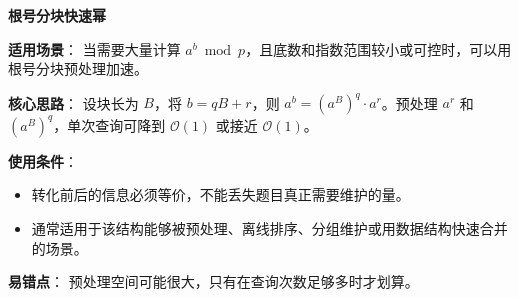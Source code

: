 \par\medskip\noindent\textbf{根号分块快速幂}\par\smallskip
\textbf{适用场景}：
当需要大量计算 $a^b\bmod p$，且底数和指数范围较小或可控时，可以用根号分块预处理加速。

\textbf{核心思路}：
设块长为 $B$，将 $b=qB+r$，则 $a^b=(a^B)^q\cdot a^r$。预处理 $a^r$ 和 $(a^B)^q$，单次查询可降到 $\mathcal{O}(1)$ 或接近 $\mathcal{O}(1)$。

\textbf{使用条件}：
\begin{itemize}
  \item 转化前后的信息必须等价，不能丢失题目真正需要维护的量。
  \item 通常适用于该结构能够被预处理、离线排序、分组维护或用数据结构快速合并的场景。
\end{itemize}

\textbf{易错点}：
预处理空间可能很大，只有在查询次数足够多时才划算。


